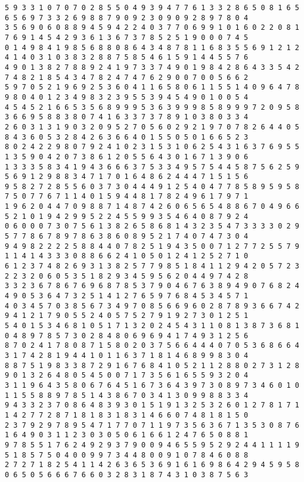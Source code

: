 \begin{verbatim}
5 9 3 3 1 0 7 0 7 0 2 8 5 5 0 4 9 3 9 4 7 7 6 1 3 3 2 8 6 5 0 8 1 6 5 6 5 6 9 7 3 3 2 6 9 8 8 7 9 0 9 2 3 0 9 0 9 2 8 9 7 8 0 4
3 5 6 9 0 6 0 8 8 9 4 5 9 4 2 2 4 0 3 7 7 0 6 9 9 1 0 1 6 0 2 2 0 8 1 7 6 9 1 4 5 4 2 9 3 6 1 3 6 7 3 7 8 5 2 5 1 9 0 0 0 7 4 5
0 1 4 9 8 4 1 9 8 5 6 8 8 0 8 6 4 3 4 8 7 8 1 1 6 8 3 5 5 6 9 1 2 1 2 4 1 4 0 3 1 0 3 8 3 2 8 8 7 5 8 5 4 6 1 5 9 1 4 4 5 5 7 6
4 9 0 1 3 8 2 7 8 8 9 2 4 1 9 7 3 3 7 4 9 0 1 9 8 4 2 8 6 4 3 3 5 4 2 7 4 8 2 1 8 5 4 3 4 7 8 2 4 7 4 7 6 2 9 0 0 7 0 0 5 6 6 2
5 9 7 0 5 2 1 9 6 9 2 5 3 6 0 4 1 1 6 5 8 0 6 1 1 5 5 1 4 0 9 6 4 7 8 9 8 0 4 0 1 2 3 4 9 8 3 2 3 9 5 5 3 9 4 5 4 9 0 1 0 0 5 4
4 5 4 5 2 1 6 6 5 3 5 6 8 9 9 9 5 3 6 3 9 9 9 8 5 8 9 9 9 7 2 0 9 5 8 3 6 6 9 5 8 8 3 8 0 7 4 1 6 3 3 7 3 7 8 9 1 0 3 8 0 3 3 4
2 6 0 3 1 3 1 9 0 3 2 0 9 5 2 7 0 5 6 0 2 9 2 1 9 7 0 7 8 2 6 4 4 0 5 8 4 3 6 0 5 3 2 8 4 2 6 3 6 6 4 0 1 5 5 0 5 0 1 6 6 5 2 3
8 0 2 4 2 2 9 8 0 7 9 2 4 1 0 2 3 1 5 3 1 0 6 2 5 4 3 1 6 3 7 6 9 5 5 1 3 5 9 0 4 2 0 7 3 8 6 1 2 0 5 5 6 4 3 0 1 6 7 1 3 9 0 6
1 3 3 3 5 8 3 4 1 9 4 3 6 6 6 3 7 5 3 3 4 9 5 7 5 4 4 5 8 7 5 6 2 5 9 5 6 9 1 2 9 8 8 3 4 7 1 7 0 1 6 4 8 6 2 4 4 4 7 1 5 1 5 6
9 5 8 2 7 2 8 5 5 6 0 3 7 3 0 4 4 4 9 1 2 5 4 0 4 7 7 8 5 8 9 5 9 5 8 7 5 0 7 7 6 7 1 1 4 0 1 5 9 4 4 8 1 7 8 2 4 9 6 1 7 9 7 1
1 9 6 2 0 4 4 7 0 9 8 8 7 1 4 8 7 4 2 6 0 6 5 6 5 4 8 8 6 7 0 4 9 6 6 5 2 1 0 1 9 4 2 9 9 5 2 2 4 5 5 9 9 3 5 4 6 4 0 8 7 9 2 4
0 6 0 0 0 7 3 0 7 5 6 1 3 8 2 6 5 8 6 8 1 4 3 2 3 5 4 7 3 3 3 3 0 2 9 5 7 7 8 6 7 8 9 7 8 6 3 8 6 0 8 9 5 2 1 7 4 0 7 4 7 3 0 4
9 4 9 8 2 2 2 2 5 8 8 4 4 0 7 8 2 5 1 9 4 3 5 0 0 7 1 2 7 7 2 5 5 7 9 1 1 4 1 4 3 3 3 0 8 8 6 6 2 4 1 0 5 0 1 2 4 1 2 5 2 7 1 0
6 1 2 3 7 4 8 2 6 9 3 1 3 8 2 5 7 7 9 8 5 1 8 4 1 1 2 9 4 2 0 5 7 2 3 2 2 3 2 0 6 0 5 3 5 1 8 2 9 3 4 5 9 5 6 2 0 4 4 9 7 4 2 8
3 3 2 3 6 7 8 6 7 6 9 6 8 7 8 5 3 7 9 0 4 6 7 6 3 8 9 4 9 0 7 6 8 2 4 4 9 0 5 3 6 4 7 3 2 5 1 4 1 2 7 6 5 9 7 6 8 4 5 3 4 5 7 1
4 0 3 4 5 7 0 3 8 5 6 7 3 4 9 7 0 8 5 6 6 9 6 0 2 8 7 8 9 3 6 6 7 4 2 9 4 1 2 1 7 9 0 5 5 2 4 0 5 7 5 2 7 9 1 9 2 7 3 0 1 2 5 1
5 4 0 1 5 3 4 6 8 1 0 5 1 7 1 3 2 0 2 4 5 4 3 1 1 0 8 1 3 8 7 3 6 8 1 0 4 8 9 7 8 5 7 3 0 2 8 4 8 0 6 9 6 9 4 1 7 4 9 3 1 2 5 6
8 7 0 2 4 1 7 8 0 8 7 1 5 8 0 2 0 3 7 5 6 6 4 4 4 0 7 0 5 3 6 8 6 6 4 3 1 7 4 2 8 1 9 4 4 1 0 1 1 6 3 7 1 8 1 4 6 8 9 9 8 3 0 4
8 8 7 5 1 9 8 3 3 8 7 2 9 1 6 7 6 8 4 1 0 5 2 1 1 2 8 8 0 2 7 3 1 2 8 9 0 1 3 2 6 4 8 0 5 4 5 0 0 7 1 7 3 5 6 1 6 5 5 9 3 2 0 4
3 1 1 9 6 4 3 5 8 0 6 7 6 4 5 1 6 7 3 6 4 3 9 7 3 0 8 9 7 3 4 6 0 1 0 1 1 5 5 8 8 9 7 8 5 1 4 3 8 6 7 0 3 4 1 3 0 9 9 8 8 3 3 4
9 4 3 3 2 3 7 0 8 6 4 8 3 9 3 0 1 5 1 9 1 3 2 5 3 2 6 0 1 2 7 8 1 7 1 1 4 2 7 7 2 8 7 1 8 1 8 3 1 8 3 1 4 6 6 0 7 4 8 1 8 1 5 0
2 3 7 9 2 9 7 8 9 5 4 7 1 7 7 0 7 1 1 9 7 3 5 6 3 6 7 1 3 5 3 0 8 7 6 1 6 4 9 0 3 1 1 2 3 0 3 0 5 0 6 1 6 6 1 2 4 7 6 5 0 8 8 1
9 7 8 5 5 1 7 6 2 4 9 2 9 3 7 9 0 0 9 4 6 5 5 9 5 2 9 2 4 4 1 1 1 1 9 5 1 8 5 7 5 0 4 0 0 9 9 7 3 4 4 8 0 0 9 1 0 7 8 4 6 0 8 8
2 7 2 7 1 8 2 5 4 1 1 4 2 6 3 6 5 3 6 9 1 6 1 6 9 8 6 4 2 9 4 5 9 5 8 0 6 5 0 5 6 6 6 7 6 6 0 3 2 8 3 1 8 7 4 3 1 0 3 8 7 5 6 3
\end{verbatim}

